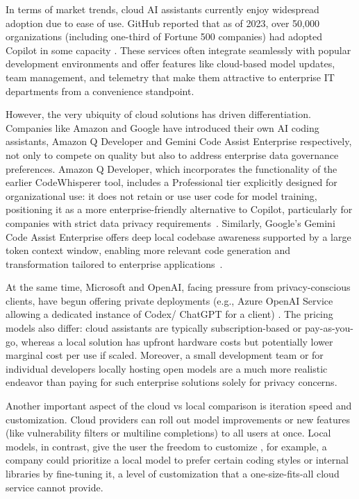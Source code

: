In terms of market trends, cloud \gls{AI} assistants currently enjoy widespread adoption due to ease of use. GitHub reported that as of 2023, over 50,000 organizations (including one-third of Fortune 500 companies) had adopted Copilot in some capacity \autocite{Opsera2024}. These services often integrate seamlessly with popular development environments and offer features like cloud-based model updates, team management, and telemetry that make them attractive to enterprise IT departments from a convenience standpoint.

However, the very ubiquity of cloud solutions has driven differentiation. Companies like Amazon and Google have introduced their own \gls{AI} coding assistants, Amazon Q Developer and Gemini Code Assist Enterprise respectively, not only to compete on quality but also to address enterprise data governance preferences. Amazon Q Developer, which incorporates the functionality of the earlier CodeWhisperer tool, includes a Professional tier explicitly designed for organizational use: it does not retain or use user code for model training, positioning it as a more enterprise-friendly alternative to Copilot, particularly for companies with strict data privacy requirements~\autocite{AmazonQDeveloper}. Similarly, Google's Gemini Code Assist Enterprise offers deep local codebase awareness supported by a large token context window, enabling more relevant code generation and transformation tailored to enterprise applications~\autocite{google2024gemini}.

At the same time, Microsoft and OpenAI, facing pressure from privacy-conscious clients, have begun offering private deployments (e.g., Azure OpenAI Service allowing a dedicated instance of Codex/ ChatGPT for a client) \autocite{MicrosoftAzureOpenAIPrivateDeployment}. The pricing models also differ: cloud assistants are typically subscription-based or pay-as-you-go, whereas a local solution has upfront hardware costs but potentially lower marginal cost per use if scaled. Moreover, a small development team or for individual developers locally hosting open models are a much more realistic endeavor than paying for such enterprise solutions solely for privacy concerns.

Another important aspect of the cloud vs local comparison is iteration speed and customization. Cloud providers can roll out model improvements or new features (like vulnerability filters or multiline completions) to all users at once. Local models, in contrast, give the user the freedom to customize ,  for example, a company could prioritize a local model to prefer certain coding styles or internal libraries by fine-tuning it, a level of customization that a one-size-fits-all cloud service cannot provide.

